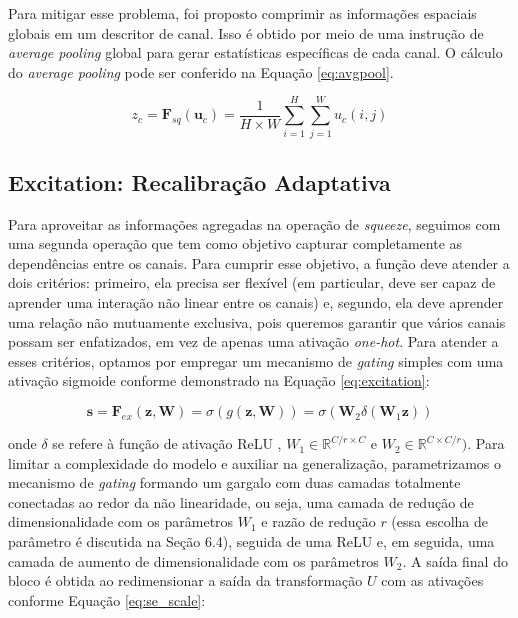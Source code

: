 Para mitigar esse problema, foi proposto comprimir as informações espaciais globais em um descritor de canal. Isso é obtido por meio de uma instrução de \textit{average pooling} global para gerar estatísticas específicas de cada canal. O cálculo do \textit{average pooling} pode ser conferido na Equação \ref{eq:avgpool}.

\begin{equation}
z_c = \mathbf{F}_{sq}(\mathbf{u}_c) = \frac{1}{H \times W} \sum_{i=1}^{H} \sum_{j=1}^{W} u_c(i, j)
\label{eq:avgpool}
\end{equation}

\subsection{Excitation: Recalibração Adaptativa}
\label{subsec:excitation}

Para aproveitar as informações agregadas na operação de \textit{squeeze}, seguimos com uma segunda operação que tem como objetivo capturar completamente as dependências entre os canais. Para cumprir esse objetivo, a função deve atender a dois critérios: primeiro, ela precisa ser flexível (em particular, deve ser capaz de aprender uma interação não linear entre os canais) e, segundo, ela deve aprender uma relação não mutuamente exclusiva, pois queremos garantir que vários canais possam ser enfatizados, em vez de apenas uma ativação \textit{one-hot}. Para atender a esses critérios, optamos por empregar um mecanismo de \textit{gating} simples com uma ativação sigmoide conforme demonstrado na Equação \ref{eq:excitation}:

\begin{equation}
\mathbf{s} = \mathbf{F}_{ex}(\mathbf{z}, \mathbf{W}) = \sigma(g(\mathbf{z}, \mathbf{W})) = \sigma(\mathbf{W}_2 \delta(\mathbf{W}_1 \mathbf{z}))
\label{eq:excitation}
\end{equation}

\noindent onde $\delta$ se refere à função de ativação ReLU \cite{nairRectifiedLinearUnits}, $ W_1 \in \mathbb{R}^{C/r \times C}$ e $W_2 \in \mathbb{R}^{C \times C/r})$. Para limitar a complexidade do modelo e auxiliar na generalização, parametrizamos o mecanismo de \textit{gating} formando um gargalo com duas camadas totalmente conectadas ao redor da não linearidade, ou seja, uma camada de redução de dimensionalidade com os parâmetros $W_1$ e razão de redução $r$ (essa escolha de parâmetro é discutida na Seção 6.4), seguida de uma ReLU e, em seguida, uma camada de aumento de dimensionalidade com os parâmetros $W_2$. A saída final do bloco é obtida ao redimensionar a saída da transformação $U$ com as ativações conforme Equação \ref{eq:se_scale}:

